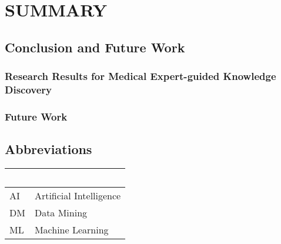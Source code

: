 \documentclass[
]{book}
\newenvironment{cslreferences}%
  {}%
  {\par}
\begin{document}
\hypertarget{part-summary}{%
\part{SUMMARY}\label{part-summary}}

\hypertarget{summary}{%
\chapter{Conclusion and Future Work}\label{summary}}

\hypertarget{research-results-for-medical-expert-guided-knowledge-discovery}{%
\section{Research Results for Medical Expert-guided Knowledge Discovery}\label{research-results-for-medical-expert-guided-knowledge-discovery}}

\hypertarget{future-work}{%
\section{Future Work}\label{future-work}}

\hypertarget{appendix-appendix}{%
\appendix}


\hypertarget{refs}{}
\begin{cslreferences}
\end{cslreferences}

\hypertarget{abbreviations}{%
\chapter*{Abbreviations}\label{abbreviations}}

\begin{longtable}[]{@{}ll@{}}
\toprule
~ & ~\tabularnewline
\midrule
\endhead
AI & Artificial Intelligence\tabularnewline
DM & Data Mining\tabularnewline
ML & Machine Learning\tabularnewline
\bottomrule
\end{longtable}

\printbibliography
\end{document}
